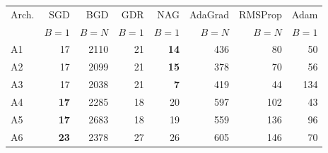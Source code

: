 \begin{tabular}{lrrrrrrr}
\toprule
Arch. & SGD & BGD & GDR & NAG & AdaGrad & RMSProp & Adam \\
 & {\scriptsize $B{=}1$} & {\scriptsize $B{=}N$} & {\scriptsize $B{=}1$} & {\scriptsize $B{=}1$} & {\scriptsize $B{=}N$} & {\scriptsize $B{=}N$} & {\scriptsize $B{=}1$} \\
\midrule
A1 & 17 & 2110 & 21 & \textbf{14} & 436 & 80 & 50 \\
A2 & 17 & 2099 & 21 & \textbf{15} & 378 & 70 & 56 \\
A3 & 17 & 2038 & 21 & \textbf{7} & 419 & 44 & 134 \\
A4 & \textbf{17} & 2285 & 18 & 20 & 597 & 102 & 43 \\
A5 & \textbf{17} & 2683 & 18 & 19 & 559 & 136 & 96 \\
A6 & \textbf{23} & 2378 & 27 & 26 & 605 & 146 & 70 \\
\bottomrule
\end{tabular}
